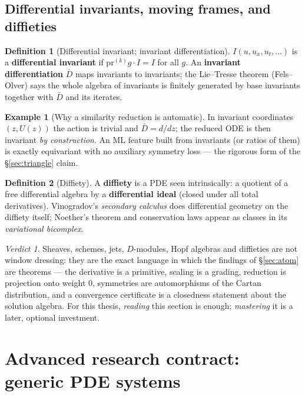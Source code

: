 \documentclass[11pt]{article}
\theoremstyle{definition}
\newtheorem{definition}{Definition}[section]
\newtheorem{example}{Example}[section]
\theoremstyle{remark}
\newtheorem*{verdict}{Verdict}
\begin{document}
\subsection{Differential invariants, moving frames, and diffieties}

\begin{definition}[Differential invariant; invariant differentiation]
$I(u,u_x,u_t,\dots)$ is a \textbf{differential invariant} if $\mathrm{pr}^{(k)}g\cdot I=I$ for all $g$.
An \textbf{invariant differentiation} $\bar D$ maps invariants to invariants; the Lie--Tresse theorem
(Fels--Olver) says the whole algebra of invariants is finitely generated by base invariants together
with $\bar D$ and its iterates.
\end{definition}

\begin{example}[Why a similarity reduction is automatic]
In invariant coordinates $(z,U(z))$ the action is trivial and $\bar D=d/dz$; the reduced ODE is then
invariant \emph{by construction}. An ML feature built from invariants (or ratios of them) is exactly
equivariant with no auxiliary symmetry loss --- the rigorous form of the \S\ref{sec:triangle} claim.
\end{example}

\begin{definition}[Diffiety]
A \textbf{diffiety} is a PDE seen intrinsically: a quotient of a free differential algebra by a
\textbf{differential ideal} (closed under all total derivatives). Vinogradov's \emph{secondary
calculus} does differential geometry on the diffiety itself; Noether's theorem and conservation laws
appear as classes in its \emph{variational bicomplex}.
\end{definition}

\begin{verdict}
Sheaves, schemes, jets, $D$-modules, Hopf algebras and diffieties are not window dressing: they are the
exact language in which the findings of \S\ref{sec:atom} are theorems --- the derivative is a primitive,
scaling is a grading, reduction is projection onto weight $0$, symmetries are automorphisms of the
Cartan distribution, and a convergence certificate is a closedness statement about the solution algebra.
For this thesis, \emph{reading} this section is enough; \emph{mastering} it is a later, optional
investment.
\end{verdict}

\section{Advanced research contract: generic PDE systems}
\label{sec:generic-pqr}
\end{document}
